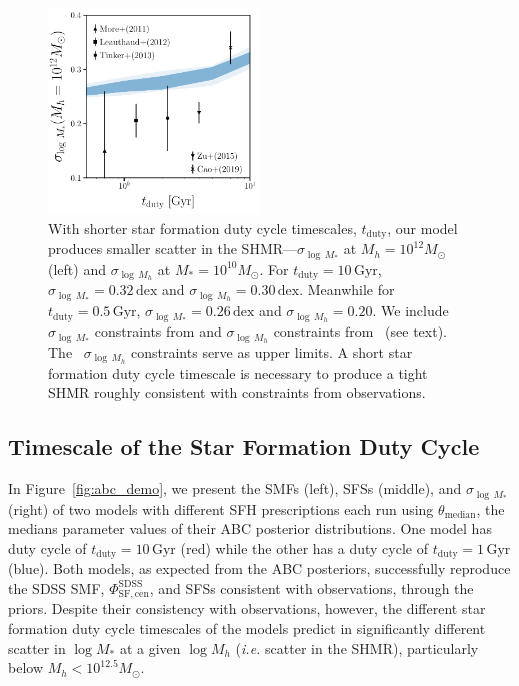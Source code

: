 \documentclass[12pt, letterpaper, preprint, tighten]{aastex62}
\begin{document}
\begin{figure}
\begin{center}
\includegraphics[width=0.5\textwidth]{figs/SHMRscatter_tduty.pdf}
    \caption{With shorter star formation duty cycle timescales, $t_\mathrm{duty}$, our 
    model produces smaller scatter in the SHMR---$\sigma_{\log\,M_*}$ at 
    $M_h{=}10^{12} M_\odot$ (left) and $\sigma_{\log\,M_h}$ at $M_*{=}10^{10} M_\odot$. 
    For $t_\mathrm{duty} = 10\,\mathrm{Gyr}$, $\sigma_{\log\,M_*} = 0.32\,\mathrm{dex}$ 
    and $\sigma_{\log\,M_h} = 0.30\,\mathrm{dex}$. Meanwhile for 
    $t_\mathrm{duty} = 0.5\,\mathrm{Gyr}$, $\sigma_{\log\,M_*}= 0.26\,\mathrm{dex}$ 
    and $\sigma_{\log\,M_h} = 0.20$. We include $\sigma_{\log\,M_*}$ constraints 
    from \cite{yang2009, more2011, leauthaud2012, tinker2013, zu2015} and 
    $\sigma_{\log\,M_h}$ constraints 
    from~\cite{mandelbaum2006, conroy2007, more2011, velander2014, han2015} (see text).
    The~\cite{mandelbaum2006, han2015} $\sigma_{\log\,M_h}$ constraints serve as upper 
    limits. A short star formation duty cycle timescale is necessary to produce a tight 
    SHMR roughly consistent with constraints from observations. 
    }
\label{fig:sigMstar_duty}
\end{center}
\end{figure}
\subsection{Timescale of the Star Formation Duty Cycle} \label{sec:sfdutycycle}
In Figure~\ref{fig:abc_demo}, we present the SMFs (left), SFSs (middle), and 
$\sigma_{\log\,M_*}$ (right) of two models with different SFH prescriptions 
each run using $\theta_\mathrm{median}$, the medians parameter values 
of their ABC posterior distributions. One model has duty cycle of 
$t_\mathrm{duty} = 10\,\mathrm{Gyr}$ (red) while the other has a duty cycle 
of $t_\mathrm{duty} = 1\,\mathrm{Gyr}$ (blue). Both models, as expected from 
the ABC posteriors, successfully reproduce the SDSS SMF, 
$\Phi^\mathrm{SDSS}_\mathrm{SF,cen}$, and SFSs consistent with observations, 
through the priors. Despite their consistency with observations, however, 
the different star formation duty cycle timescales of the models predict 
in significantly different scatter in $\log M_*$ at a given $\log M_h$ 
(\emph{i.e.} scatter in the SHMR), particularly below $M_h < 10^{12.5}M_\odot$. 
\end{document}
